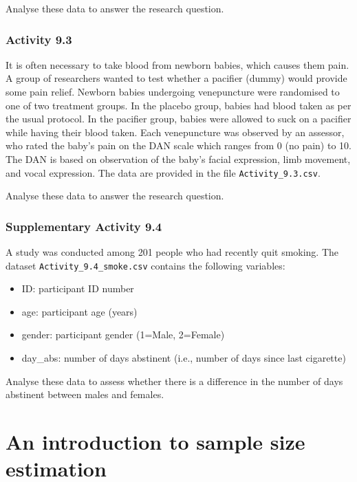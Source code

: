 \documentclass[
  a4paper,
]{memoir}
\providecommand{\tightlist}{%
  \setlength{\itemsep}{0pt}\setlength{\parskip}{0pt}}
\begin{document}
Analyse these data to answer the research question.

\subsection*{Activity 9.3}\label{activity-9.3}

It is often necessary to take blood from newborn babies, which causes
them pain. A group of researchers wanted to test whether a pacifier
(dummy) would provide some pain relief. Newborn babies undergoing
venepuncture were randomised to one of two treatment groups. In the
placebo group, babies had blood taken as per the usual protocol. In the
pacifier group, babies were allowed to suck on a pacifier while having
their blood taken. Each venepuncture was observed by an assessor, who
rated the baby's pain on the DAN scale which ranges from 0 (no pain) to
10. The DAN is based on observation of the baby's facial expression,
limb movement, and vocal expression. The data are provided in the file
\texttt{Activity\_9.3.csv}.

Analyse these data to answer the research question.

\subsection*{Supplementary Activity
9.4}\label{supplementary-activity-9.4}

A study was conducted among 201 people who had recently quit smoking.
The dataset \texttt{Activity\_9.4\_smoke.csv} contains the following
variables:

\begin{itemize}
\tightlist
\item
  ID: participant ID number
\item
  age: participant age (years)
\item
  gender: participant gender (1=Male, 2=Female)
\item
  day\_abs: number of days abstinent (i.e., number of days since last
  cigarette)
\end{itemize}

Analyse these data to assess whether there is a difference in the number
of days abstinent between males and females.


\chapter{An introduction to sample size
estimation}\label{an-introduction-to-sample-size-estimation}
\end{document}

